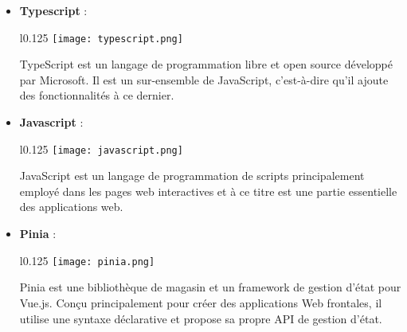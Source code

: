 \begin{itemize}
    \item \textbf{Typescript} :\\
    \begin{minipage}{\linewidth}
      \begin{wrapfigure}{l}{0.125\textwidth}
        \vspace{-0.5cm}
        \texttt{[image: typescript.png]} 
      \end{wrapfigure}
      TypeScript est un langage de programmation libre et open source développé par Microsoft. Il est un sur-ensemble de JavaScript, c'est-à-dire qu'il ajoute des fonctionnalités à ce dernier. \cite{typescript}
    \end{minipage}
  
    \vspace{0.5cm}
  
    \item \textbf{Javascript} :\\
    \begin{minipage}{\linewidth}
      \begin{wrapfigure}{l}{0.125\textwidth}
        \vspace{-0.5cm}
        \texttt{[image: javascript.png]} 
      \end{wrapfigure}
      JavaScript est un langage de programmation de scripts principalement employé dans les pages web interactives et à ce titre est une partie essentielle des applications web. \cite{javascript}
    \end{minipage}

    \vspace{0.5cm}
  
    \item \textbf{Pinia} :\\
    \begin{minipage}{\linewidth}
      \begin{wrapfigure}{l}{0.125\textwidth}
        \vspace{-0.5cm}
        \texttt{[image: pinia.png]} 
      \end{wrapfigure}
      Pinia est une bibliothèque de magasin et un framework de gestion d'état pour Vue.js. Conçu principalement pour créer des applications Web frontales, il utilise une syntaxe déclarative et propose sa propre API de gestion d'état. \cite{pinia}
    \end{minipage}
    
    \vspace{0.5cm}
  

\end{itemize}
